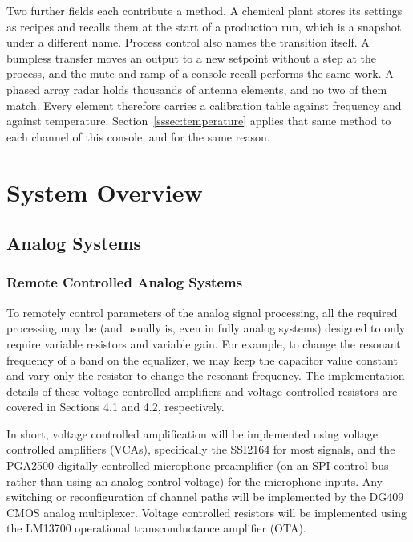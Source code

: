 \documentclass[11pt, letterpaper,titlepage]{article}
\begin{document}
Two further fields each contribute a method. A chemical plant stores its
settings as recipes and recalls them at the start of a production run, which is
a snapshot under a different name. Process control also names the transition
itself. A bumpless transfer moves an output to a new setpoint without a step at
the process, and the mute and ramp of a console recall performs the same work.
A phased array radar holds thousands of antenna elements, and no two of them
match. Every element therefore carries a calibration table against frequency and
against temperature. Section~\ref{sssec:temperature} applies that same method to
each channel of this console, and for the same reason.




\newpage
\section{System Overview}




\subsection{Analog Systems}

\subsubsection*{Remote Controlled Analog Systems}
To remotely control parameters of the analog signal processing, all the required processing may be (and usually is, even in fully analog systems) designed to only require variable resistors and variable gain. For example, to change the resonant frequency of a band on the equalizer, we may keep the capacitor value constant and vary only the resistor to change the resonant frequency. The implementation details of these voltage controlled amplifiers and voltage controlled resistors are covered in Sections 4.1 and 4.2, respectively.

In short, voltage controlled amplification will be implemented using voltage controlled amplifiers (VCAs), specifically the SSI2164 for most signals, and the PGA2500 digitally controlled microphone preamplifier (on an SPI control bus rather than using an analog control voltage) for the microphone inputs. Any switching or reconfiguration of channel paths will be implemented by the DG409 CMOS analog multiplexer. Voltage controlled resistors will be implemented using the LM13700 operational transconductance amplifier (OTA).
\end{document}
